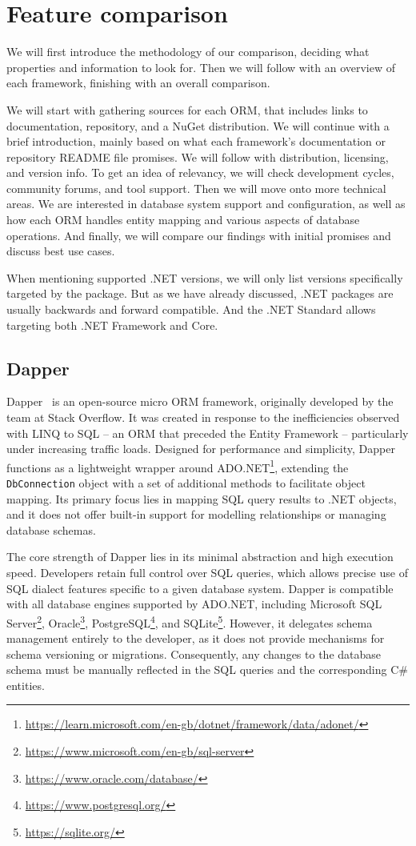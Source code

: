 \section{Feature comparison}
We will first introduce the methodology of our comparison, deciding what properties and information to look for. Then we will follow with an overview of each framework, finishing with an overall comparison.

We will start with gathering sources for each ORM, that includes links to documentation, repository, and a NuGet distribution. We will continue with a brief introduction, mainly based on what each framework's documentation or repository README file promises. We will follow with distribution, licensing, and version info. To get an idea of relevancy, we will check development cycles, community forums, and tool support. Then we will move onto more technical areas. We are interested in database system support and configuration, as well as how each ORM handles entity mapping and various aspects of database operations. And finally, we will compare our findings with initial promises and discuss best use cases.

When mentioning supported .NET versions, we will only list versions specifically targeted by the package. But as we have already discussed, .NET packages are usually backwards and forward compatible. And the .NET Standard allows targeting both .NET Framework and Core.

\subsection{Dapper}\label{sec:feat_dapper}

Dapper~\cite{Dapper,DapperRepo} is an open-source micro ORM framework, originally developed by the team at Stack Overflow. It was created in response to the inefficiencies observed with LINQ to SQL -- an ORM that preceded the Entity Framework -- particularly under increasing traffic loads. Designed for performance and simplicity, Dapper functions as a lightweight wrapper around ADO.NET\footnote{\url{https://learn.microsoft.com/en-gb/dotnet/framework/data/adonet/}}, extending the \texttt{DbConnection} object with a set of additional methods to facilitate object mapping. Its primary focus lies in mapping SQL query results to .NET objects, and it does not offer built-in support for modelling relationships or managing database schemas.

The core strength of Dapper lies in its minimal abstraction and high execution speed. Developers retain full control over SQL queries, which allows precise use of SQL dialect features specific to a given database system. Dapper is compatible with all database engines supported by ADO.NET, including Microsoft SQL Server\footnote{\url{https://www.microsoft.com/en-gb/sql-server}}, Oracle\footnote{\url{https://www.oracle.com/database/}}, PostgreSQL\footnote{\url{https://www.postgresql.org/}}, and SQLite\footnote{\url{https://sqlite.org/}}. However, it delegates schema management entirely to the developer, as it does not provide mechanisms for schema versioning or migrations. Consequently, any changes to the database schema must be manually reflected in the SQL queries and the corresponding C\# entities.

